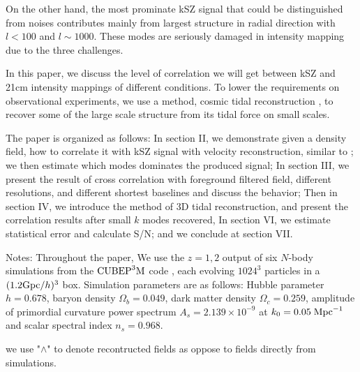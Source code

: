 On the other hand, the most prominate kSZ signal that could be distinguished from noises  
contributes mainly from largest structure in radial direction 
with $l < 100$ and $l \sim 1000$. 
These modes are seriously damaged in intensity mapping due to the three challenges. 

In this paper, we discuss the level of correlation we will get 
between kSZ and 21cm intensity mappings of different conditions. 
To lower the requirements on observational experiments, we use a method, cosmic tidal reconstruction \cite{2012:pen,2015:zhu}, 
to recover some of the large scale structure from its tidal force on small scales. 
 

The paper is organized as follows: 
In section II, we demonstrate given a density field, how to correlate it with kSZ signal with velocity reconstruction, similar to \cite{Shao11}; 
we then estimate which modes dominates the produced signal; 
In section III, we present the result of cross correlation with foreground filtered field, different resolutions, and different shortest baselines  
and discuss the behavior; 
Then in section IV, we introduce the method of 3D tidal reconstruction, 
and present the correlation results after small $k$ modes recovered, 
In section VI, we estimate statistical error and calculate S/N; 
and we conclude at section VII.


Notes: 
Throughout the paper, We use the $z=1,2$ output of six $N$-body simulations from the
$\mathrm{CUBEP}^3\mathrm{M}$ code \cite{2013:code}, each evolving $1024^3$ particles in a $(1.2\mathrm{Gpc}/h)^3$ box. 
Simulation parameters are as follows: Hubble parameter $h=0.678$, baryon
density $\Omega_{b}=0.049$, dark matter density $\Omega_{c}=0.259$,
amplitude of primordial curvature power spectrum $A_s=2.139\times10^{-9}$ at 
$k_0=0.05\;\mathrm{Mpc}^{-1}$ and scalar spectral index $n_s=0.968$.

we use "$\wedge$" to denote recontructed fields as 
oppose to fields directly from simulations.
